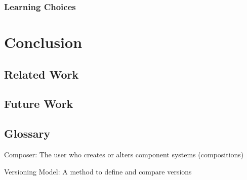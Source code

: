 \documentclass{report}
\begin{document}
\subsection{Learning Choices}




\chapter{Conclusion}
\section{Related Work}
\section{Future Work}

\section{Glossary}
Composer: The user who creates or alters component systems (compositions)

Versioning Model: A method to define and compare versions
\end{document}

